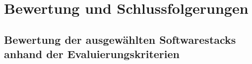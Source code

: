 \chapter{Bewertung und Schlussfolgerungen}\label{sec:bewertung}
\section{Bewertung der ausgewählten Softwarestacks anhand der Evaluierungskriterien}